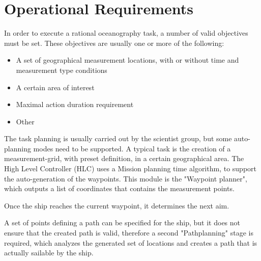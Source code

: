 \section{Operational Requirements}

In order to execute a rational oceanography task, a number of valid objectives must be set. These objectives are usually one or more of the following\cite{oceanography}:

\begin{itemize}
\item A set of geographical measurement locations, with or without time and measurement type conditions
\item A certain area of interest
\item Maximal action duration requirement
\item Other
\end{itemize}

The task planning is usually carried out by the scientist group, but some auto-planning modes need to be supported. A typical task is the creation of a measurement-grid, with preset definition, in a certain geographical area. The High Level Controller (HLC) uses a Mission planning time algorithm, to support the auto-generation of the waypoints. This module is the "Waypoint planner", which outputs a list of coordinates that contains the measurement points.

Once the ship reaches the current waypoint, it determines the next aim.

A set of points defining a path can be specified for the ship, but it does not ensure that the created path is valid, therefore a second "Pathplanning" stage is required, which analyzes the generated set of locations and creates a path that is actually sailable by the ship.